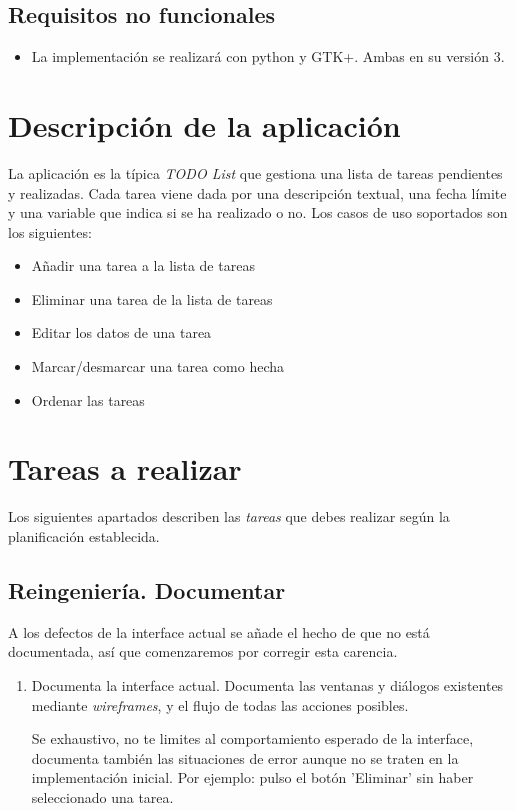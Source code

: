 \documentclass[11pt,a4paper]{article}
\begin{document}
\subsection{Requisitos no funcionales}
\begin{itemize}
\item La implementación se realizará con python y GTK+. Ambas en su
  versión 3.
\end{itemize}

\section{Descripción de la aplicación}

La aplicación es la típica \textit{TODO List} que gestiona una lista
de tareas pendientes y realizadas. Cada tarea viene dada por una
descripción textual, una fecha límite y una variable que indica si se
ha realizado o no. Los casos de uso soportados son los siguientes:

\begin{itemize}
 \item Añadir una tarea a la lista de tareas
 \item Eliminar una tarea de la lista de tareas
 \item Editar los datos de una tarea
 \item Marcar/desmarcar una tarea como hecha
 \item Ordenar las tareas 
\end{itemize}

\section{Tareas a realizar}
Los siguientes apartados describen las \emph{tareas} que debes
realizar según la planificación establecida.


\subsection{Reingeniería. Documentar}
\label{subsec:documentar}

A los defectos de la interface actual se añade el hecho de que no está
documentada, así que comenzaremos por corregir esta carencia.

\begin{enumerate}
\item Documenta la interface actual. Documenta las ventanas y
  diálogos existentes mediante \textit{wireframes}, y el flujo de
  todas las acciones posibles.

  Se exhaustivo, no te limites al comportamiento esperado de la
  interface, documenta también las situaciones de error aunque no se
  traten en la implementación inicial. Por ejemplo: pulso el botón
  'Eliminar' sin haber seleccionado una tarea.
\end{enumerate}
\end{document}
